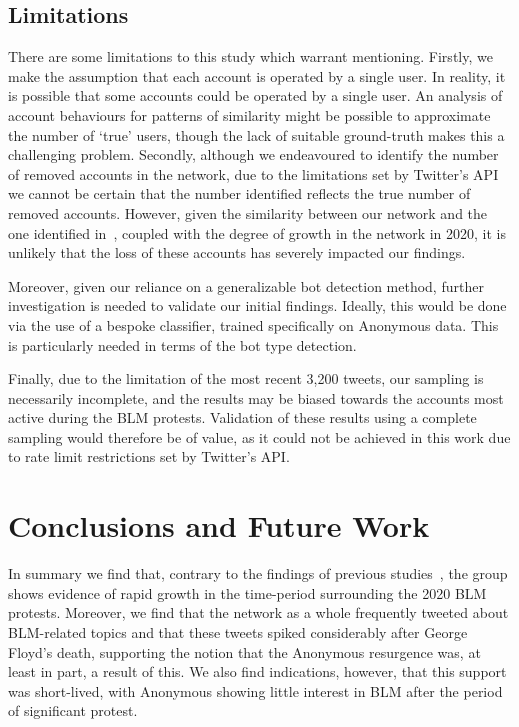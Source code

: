 \documentclass[letterpaper]{article}
\begin{document}
\subsection{Limitations}

There are some limitations to this study which warrant mentioning. Firstly, we make the assumption that each account is operated by a single user. In reality, it is possible that some accounts could be operated by a single user. An analysis of account behaviours for patterns of similarity might be possible to approximate the number of `true' users, though the lack of suitable ground-truth makes this a challenging problem.  Secondly, although we endeavoured to identify the number of removed accounts in the network, due to the limitations set by Twitter's API we cannot be certain that the number identified reflects the true number of removed accounts. However, given the similarity between our network and the one identified in~\cite{Jones2020}, coupled with the degree of growth in the network in 2020, it is unlikely that the loss of these accounts has severely impacted our findings.

Moreover, given our reliance on a generalizable bot detection method, further investigation is needed to validate our initial findings. Ideally, this would be done via the use of a bespoke classifier, trained specifically on Anonymous data. This is particularly needed in terms of the bot type detection.

Finally, due to the limitation of the most recent 3,200 tweets, our sampling is necessarily incomplete, and the results may be biased towards the accounts most active during the BLM protests. Validation of these results using a complete sampling would therefore be of value, as it could not be achieved in this work due to rate limit restrictions set by Twitter's API.

\section{Conclusions and Future Work}

In summary we find that, contrary to the findings of previous studies~\cite{Jones2020,Uitermark2017}, the group shows evidence of rapid growth in the time-period surrounding the 2020 BLM protests. Moreover, we find that the network as a whole frequently tweeted about BLM-related topics and that these tweets spiked considerably after George Floyd's death, supporting the notion that the Anonymous resurgence was, at least in part, a result of this. We also find indications, however, that this support was short-lived, with Anonymous showing little interest in BLM after the period of significant protest.
\end{document}
